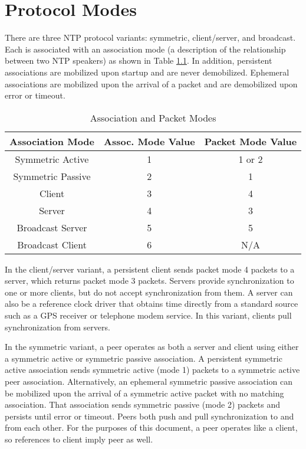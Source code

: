 \chapter{Protocol Modes}

There are three NTP protocol variants: symmetric, client/server, and
broadcast. Each is associated with an association mode (a
description of the relationship between two NTP speakers) as shown in
Table \ref{association_and_packet_modes}. In addition, persistent associations are mobilized upon
startup and are never demobilized. Ephemeral associations are
mobilized upon the arrival of a packet and are demobilized upon error
or timeout.

\begin{table}[htb]
\center
\begin{tabular}{c | c | c}
Association Mode & Assoc. Mode Value & Packet Mode Value \\
\hline
\hline
Symmetric Active & 1 & 1 or 2 \\
Symmetric Passive & 2 & 1 \\
Client & 3 & 4 \\
Server & 4 & 3 \\
Broadcast Server & 5 & 5 \\
Broadcast Client & 6 & N/A \\
\hline
\end{tabular}
\label{association_and_packet_modes}
\caption{Association and Packet Modes}
\end{table}

In the client/server variant, a persistent client sends packet mode 4
packets to a server, which returns packet mode 3 packets. Servers
provide synchronization to one or more clients, but do not accept
synchronization from them. A server can also be a reference clock
driver that obtains time directly from a standard source such as a
GPS receiver or telephone modem service. In this variant, clients
pull synchronization from servers.

In the symmetric variant, a peer operates as both a server and client
using either a symmetric active or symmetric passive association. A
persistent symmetric active association sends symmetric active (mode
1) packets to a symmetric active peer association. Alternatively, an
ephemeral symmetric passive association can be mobilized upon the
arrival of a symmetric active packet with no matching association.
That association sends symmetric passive (mode 2) packets and
persists until error or timeout. Peers both push and pull
synchronization to and from each other. For the purposes of this
document, a peer operates like a client, so references to client
imply peer as well.


